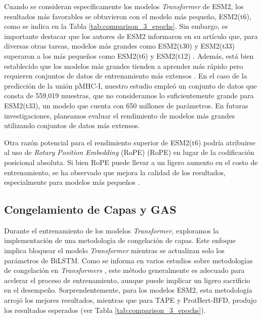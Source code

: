 Cuando se consideran específicamente los modelos \textit{Transformer} de ESM2, los resultados más favorables se obtuvieron con el modelo más pequeño, ESM2(t6), como se indica en la Tabla \ref{tab:comparison_3_epochs}. Sin embargo, es importante destacar que los autores de ESM2 informaron en su artículo que, para diversas otras tareas, modelos más grandes como ESM2(t30) y ESM2(t33) superaron a los más pequeños como ESM2(t6) y ESM2(t12) \citep{lin2023evolutionary}. Además, está bien establecido que los modelos más grandes tienden a aprender más rápido pero requieren conjuntos de datos de entrenamiento más extensos \citep{elnaggar2021prottrans}. En el caso de la predicción de la unión pMHC-I, nuestro estudio empleó un conjunto de datos que consta de 559,019 muestras, que no consideramos lo suficientemente grande para ESM2(t33), un modelo que cuenta con 650 millones de parámetros. En futuras investigaciones, planeamos evaluar el rendimiento de modelos más grandes utilizando conjuntos de datos más extensos.

Otra razón potencial para el rendimiento superior de ESM2(t6) podría atribuirse al uso de \textit{Rotary Position Embedding} (RoPE) (RoPE) en lugar de la codificación posicional absoluta. Si bien RoPE puede llevar a un ligero aumento en el costo de entrenamiento, se ha observado que mejora la calidad de los resultados, especialmente para modelos más pequeños \citep{lin2023evolutionary}.

\subsection{Congelamiento de Capas y GAS}
Durante el entrenamiento de los modelos \textit{Transformer}, exploramos la implementación de una metodología de congelación de capas. Este enfoque implica bloquear el modelo \textit{Transformer} mientras se actualizan solo los parámetros de BiLSTM. Como se informa en varios estudios sobre metodologías de congelación en \textit{Transformers} \citep{merchant2020happens,lee2019would,kovaleva2019revealing}, este método generalmente es adecuado para acelerar el proceso de entrenamiento, aunque puede implicar un ligero sacrificio en el desempeño. Sorprendentemente, para los modelos ESM2, esta metodología arrojó los mejores resultados, mientras que para TAPE y ProtBert-BFD, produjo los resultados esperados (ver Tabla \ref{tab:comparison_3_epochs}).


